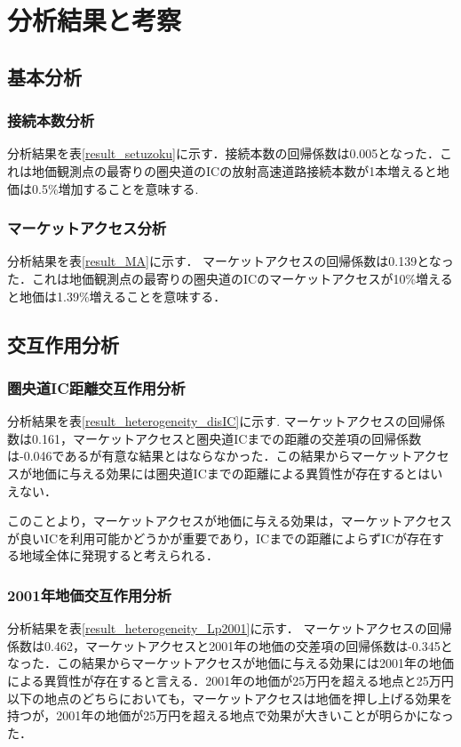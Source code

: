 \chapter{分析結果と考察}
\section{基本分析}
\subsection{接続本数分析}
分析結果を表\ref{result_setuzoku}に示す．接続本数の回帰係数は0.005となった．これは地価観測点の最寄りの圏央道のICの放射高速道路接続本数が1本増えると地価は0.5\%増加することを意味する.

\subsection{マーケットアクセス分析}
分析結果を表\ref{result_MA}に示す．
マーケットアクセスの回帰係数は0.139となった．これは地価観測点の最寄りの圏央道のICのマーケットアクセスが10\%増えると地価は1.39\%増えることを意味する．

\section{交互作用分析}


\subsection{圏央道IC距離交互作用分析}
分析結果を表\ref{result_heterogeneity_disIC}に示す.
マーケットアクセスの回帰係数は0.161，マーケットアクセスと圏央道ICまでの距離の交差項の回帰係数は-0.046であるが有意な結果とはならなかった．この結果からマーケットアクセスが地価に与える効果には圏央道ICまでの距離による異質性が存在するとはいえない．

このことより，マーケットアクセスが地価に与える効果は，マーケットアクセスが良いICを利用可能かどうかが重要であり，ICまでの距離によらずICが存在する地域全体に発現すると考えられる．
\subsection{2001年地価交互作用分析}
分析結果を表\ref{result_heterogeneity_Lp2001}に示す．
マーケットアクセスの回帰係数は0.462，マーケットアクセスと2001年の地価の交差項の回帰係数は-0.345となった．この結果からマーケットアクセスが地価に与える効果には2001年の地価による異質性が存在すると言える．2001年の地価が25万円を超える地点と25万円以下の地点のどちらにおいても，マーケットアクセスは地価を押し上げる効果を持つが，2001年の地価が25万円を超える地点で効果が大きいことが明らかになった．

